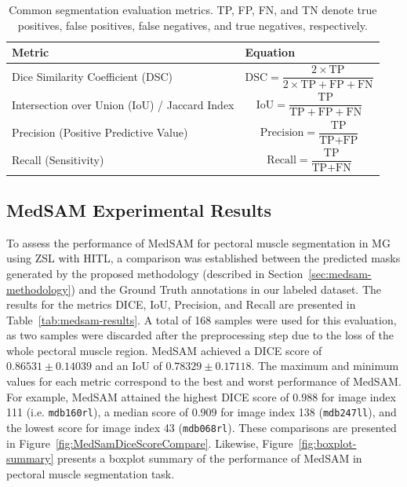 \documentclass[runningheads]{llncs}
\begin{document}
\begin{table}[h]
\centering
\caption{Common segmentation evaluation metrics. TP, FP, FN, and TN denote true positives, false positives, false negatives, and true negatives, respectively.}
\label{tab:segmentation_metrics}
\begin{tabular}{p{} p{}}
\toprule
\textbf{Metric} & \textbf{Equation}  \\
\midrule
Dice Similarity Coefficient (DSC) & 
\begin{equation}
\text{DSC} = \frac{2 \times \text{TP}}{2 \times \text{TP} + \text{FP} + \text{FN}}
\label{eq:dice}
\end{equation}  \\
\addlinespace
Intersection over Union (IoU) / Jaccard Index & 
\begin{equation}
\text{IoU} = \frac{\text{TP}}{\text{TP} + \text{FP} + \text{FN}}
\label{eq:iou}
\end{equation}  \\
\addlinespace
Precision (Positive Predictive Value) & 
\begin{equation}
\text{Precision} = \frac{\text{TP}}{\text{TP} + \text{FP}}
\label{eq:precision}
\end{equation}  \\
\addlinespace
Recall (Sensitivity) & 
\begin{equation}
\text{Recall} = \frac{\text{TP}}{\text{TP} + \text{FN}}
\label{eq:recall}
\end{equation}  \\
\bottomrule
\end{tabular}
\end{table}

\subsection{\ac{MedSAM} Experimental Results}
\label{sec:medsam-exper-results}
To assess the performance of \ac{MedSAM} for pectoral muscle
segmentation in \ac{MG} using \ac{ZSL} with \ac{HITL}, a comparison
was established between the predicted masks generated by the proposed
methodology (described in Section~\ref{sec:medsam-methodology}) and
the Ground Truth annotations in our labeled dataset. The results for
the metrics \ac{DICE}, \ac{IoU}, Precision, and Recall are presented
in Table~\ref{tab:medsam-results}. A total of 168 samples were used
for this evaluation, as two samples were discarded after the
preprocessing step due to the loss of the whole pectoral muscle
region. \ac{MedSAM} achieved a \ac{DICE} score of
\(0.86531 \pm 0.14039\) and an \ac{IoU} of \(0.78329 \pm
0.17118\). The maximum and minimum values for each metric correspond
to the best and worst performance of \ac{MedSAM}. For example,
\ac{MedSAM} attained the highest \ac{DICE} score of \(0.988\) for
image index 111 (i.e. \texttt{mdb160rl}), a median score of \(0.909\)
for image index 138 (\texttt{mdb247ll}), and the lowest score for
image index 43 (\texttt{mdb068rl}). These comparisons are presented in
Figure~\ref{fig:MedSamDiceScoreCompare}. Likewise,
Figure~\ref{fig:boxplot-summary} presents a boxplot summary of the
performance of \ac{MedSAM} in pectoral muscle segmentation task.
\end{document}
